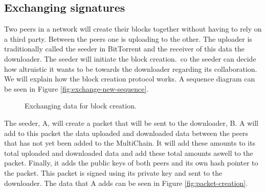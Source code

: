 \subsection{Exchanging signatures}
Two peers in a network will create their blocks together without having to rely on a third party.
Between the peers one is uploading to the other.
The uploader is traditionally called the seeder in BitTorrent and the receiver of this data the downloader\cite{Cohen-bittorrent}.
The seeder will initiate the block creation.\,
co the seeder can decide how altruistic it wants to be towards the downloader regarding its collaboration.
We will explain how the block creation protocol works.
A sequence diagram can be seen in Figure \ref{fig:exchange-new-sequence}.

\begin{figure}[tpb]
\centering
{}

\caption{Exchanging data for block creation.}
\label{fig:synthetic-anonymous-amounts}
\end{figure}

The seeder, A, will create a packet that will be sent to the downloader, B.
A will add to this packet the data uploaded and downloaded data between the peers
that has not yet been added to the MultiChain.
It will add these amounts to its total uploaded and downloaded data
and add these total amounts aswell to the packet.
Finally, it adds the public keys of both peers and its own hash pointer to the packet.
This packet is signed using its private key and sent to the downloader.
The data that A adds can be seen in Figure \ref{fig:packet-creation}.

